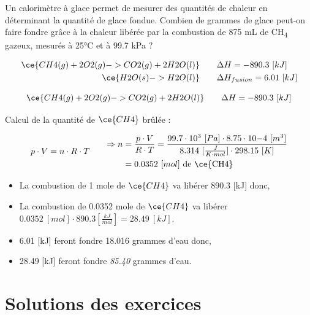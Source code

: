 \documentclass[
  11pt,
  a4paper,
  openany]{book}
\begin{document}
\begin{Exercise}

Un calorimètre à glace permet de mesurer des quantités de chaleur en déterminant la quantité de glace fondue. Combien de grammes de glace peut-on faire fondre grâce à la chaleur libérée par la combustion de 875 mL de CH\textsubscript{4} gazeux, mesurés à 25°C et à 99.7 kPa ?

\[
\begin{split}
\ce{CH4(g) + 2 O2(g) -> CO2(g) + 2 H2O(l)} \qquad & \Delta H = - 890.3\ [kJ] \\
\ce{H2O(s) -> H2O(l)} \qquad & \Delta H_{fusion} = 6.01\ [kJ]
\end{split}
\]


\end{Exercise}

\begin{Answer}

\[
\ce{CH4(g) + 2 O2(g) -> CO2(g) + 2 H2O(l)} \qquad \Delta H = - 890.3\ [kJ]
\]

Calcul de la quantité de \(\ce{CH4}\) brûlée :

\[
\begin{split}
p \cdot V = n \cdot R \cdot T
\end{split}
\qquad
\begin{split}
\Rightarrow n &= \frac{p \cdot V}{R \cdot T} = \frac{99.7 \cdot 10^{3}\ [Pa] \cdot 8.75 \cdot 10{-4}\ [m^3]}{8.314\ [\frac{J}{K \cdot mol}] \cdot 298.15\ [K]} \\
 &= 0.0352\ [mol] \text{ de \ce{CH4}}
\end{split}
\]

\begin{itemize}
\item
  La combustion de 1 mole de \(\ce{CH4}\) va libérer 890.3 {[}kJ{]} donc,
\item
  La combustion de 0.0352 mole de \(\ce{CH4}\) va libérer \(0.0352\ [mol] \cdot 890.3 [\frac{kJ}{mol}] = 28.49\ [kJ]\).
\item
  6.01 {[}kJ{]} feront fondre 18.016 grammes d'eau donc,
\item
  28.49 {[}kJ{]} feront fondre \emph{85.40} grammes d'eau.
\end{itemize}

\end{Answer}

\clearpage

\section{Solutions des exercices} \shipoutAnswer
\end{document}
